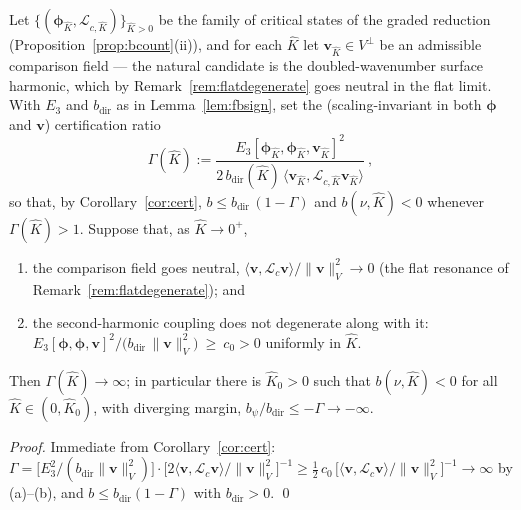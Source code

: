 \begin{proposition}
    \label{prop:certdeg}
    Let $\{(\bm{\phi}_{\hat K},\mathcal{L}_{c,\hat K})\}_{\hat K>0}$ be the family of critical states of the graded
    reduction (Proposition~\ref{prop:bcount}(ii)), and for each $\hat K$ let $\bm{v}_{\hat K}\in V^\perp$ be an
    admissible comparison field --- the natural candidate is the doubled-wavenumber surface harmonic, which by
    Remark~\ref{rem:flatdegenerate} goes neutral in the flat limit. With $E_3$ and $b_{\mathrm{dir}}$ as in
    Lemma~\ref{lem:fbsign}, set the (scaling-invariant in both $\bm\phi$ and $\bm v$) certification ratio
    \begin{equation}
        \label{eq:gammadef}
        \Gamma(\hat K) := \frac{E_3[\bm{\phi}_{\hat K},\bm{\phi}_{\hat K},\bm{v}_{\hat K}]^2}
        {2\,b_{\mathrm{dir}}(\hat K)\,\langle\bm{v}_{\hat K},\mathcal{L}_{c,\hat K}\bm{v}_{\hat K}\rangle}\ ,
    \end{equation}
    so that, by Corollary~\ref{cor:cert}, $b\le b_{\mathrm{dir}}\,(1-\Gamma)$ and $b(\nu,\hat K)<0$ whenever
    $\Gamma(\hat K)>1$. Suppose that, as $\hat K\to0^+$,
    \begin{enumerate}
        \item[\textup{(a)}] the comparison field goes neutral,
              $\langle\bm{v},\mathcal{L}_c\bm{v}\rangle/\|\bm{v}\|_V^2\to0$ (the flat resonance of
              Remark~\ref{rem:flatdegenerate}); and
        \item[\textup{(b)}] the second-harmonic coupling does not degenerate along with it:
              $E_3[\bm{\phi},\bm{\phi},\bm{v}]^2/\big(b_{\mathrm{dir}}\,\|\bm{v}\|_V^2\big)\ \ge\ c_0>0$ uniformly in
              $\hat K$.
    \end{enumerate}
    Then $\Gamma(\hat K)\to\infty$; in particular there is $\hat K_0>0$ such that $b(\nu,\hat K)<0$ for all
    $\hat K\in(0,\hat K_0)$, with diverging margin, $b_\psi/b_{\mathrm{dir}}\le-\Gamma\to-\infty$.
\end{proposition}

\begin{proof}
    Immediate from Corollary~\ref{cor:cert}:
    $\Gamma=\big[E_3^2/(b_{\mathrm{dir}}\|\bm{v}\|_V^2)\big]\cdot
        \big[2\langle\bm{v},\mathcal{L}_c\bm{v}\rangle/\|\bm{v}\|_V^2\big]^{-1}
        \ge \tfrac12\,c_0\,\big[\langle\bm{v},\mathcal{L}_c\bm{v}\rangle/\|\bm{v}\|_V^2\big]^{-1}\to\infty$
    by (a)--(b), and $b\le b_{\mathrm{dir}}(1-\Gamma)$ with $b_{\mathrm{dir}}>0$. \qed
\end{proof}

